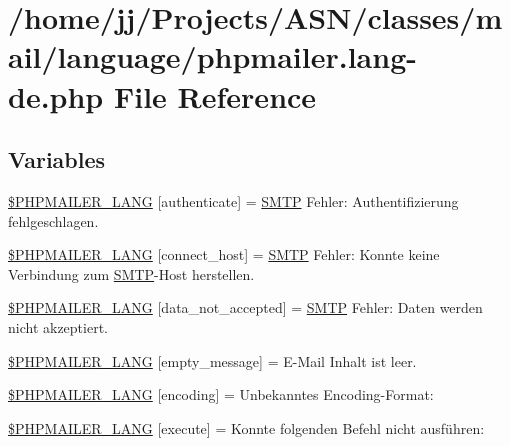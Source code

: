\hypertarget{phpmailer_8lang-de_8php}{}\section{/home/jj/\+Projects/\+A\+S\+N/classes/mail/language/phpmailer.lang-\/de.php File Reference}
\label{phpmailer_8lang-de_8php}
\subsection*{Variables}
\begin{DoxyCompactItemize}
\item 
\hyperlink{phpmailer_8lang-de_8php_a2cb33073c989b85580748e331ed8b4aa}{\$\+P\+H\+P\+M\+A\+I\+L\+E\+R\+\_\+\+L\+A\+NG} \mbox{[}\textquotesingle{}authenticate\textquotesingle{}\mbox{]} = \textquotesingle{}\hyperlink{class_s_m_t_p}{S\+M\+TP} Fehler\+: Authentifizierung fehlgeschlagen.\textquotesingle{}
\item 
\hyperlink{phpmailer_8lang-de_8php_a2ee0cc637a06b96e45600db31c6799ee}{\$\+P\+H\+P\+M\+A\+I\+L\+E\+R\+\_\+\+L\+A\+NG} \mbox{[}\textquotesingle{}connect\+\_\+host\textquotesingle{}\mbox{]} = \textquotesingle{}\hyperlink{class_s_m_t_p}{S\+M\+TP} Fehler\+: Konnte keine Verbindung zum \hyperlink{class_s_m_t_p}{S\+M\+TP}-\/Host herstellen.\textquotesingle{}
\item 
\hyperlink{phpmailer_8lang-de_8php_a814c6b191205d2361b3233e9c9d6fda5}{\$\+P\+H\+P\+M\+A\+I\+L\+E\+R\+\_\+\+L\+A\+NG} \mbox{[}\textquotesingle{}data\+\_\+not\+\_\+accepted\textquotesingle{}\mbox{]} = \textquotesingle{}\hyperlink{class_s_m_t_p}{S\+M\+TP} Fehler\+: Daten werden nicht akzeptiert.\textquotesingle{}
\item 
\hyperlink{phpmailer_8lang-de_8php_a33772099f637c9d6c2cd7425e0e37fed}{\$\+P\+H\+P\+M\+A\+I\+L\+E\+R\+\_\+\+L\+A\+NG} \mbox{[}\textquotesingle{}empty\+\_\+message\textquotesingle{}\mbox{]} = \textquotesingle{}E-\/Mail Inhalt ist leer.\textquotesingle{}
\item 
\hyperlink{phpmailer_8lang-de_8php_a817f7283f3d54c970a0c10305cc668cc}{\$\+P\+H\+P\+M\+A\+I\+L\+E\+R\+\_\+\+L\+A\+NG} \mbox{[}\textquotesingle{}encoding\textquotesingle{}\mbox{]} = \textquotesingle{}Unbekanntes Encoding-\/Format\+: \textquotesingle{}
\item 
\hyperlink{phpmailer_8lang-de_8php_a668217a9563a168f30f2a8548b6ed5a9}{\$\+P\+H\+P\+M\+A\+I\+L\+E\+R\+\_\+\+L\+A\+NG} \mbox{[}\textquotesingle{}execute\textquotesingle{}\mbox{]} = \textquotesingle{}Konnte folgenden Befehl nicht ausführen\+: \textquotesingle{}

\end{DoxyCompactItemize}
